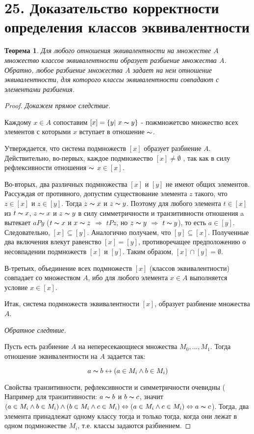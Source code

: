 \documentclass[a4paper,12pt]{article}
\newtheorem*{theorem}{Теорема}
\begin{document}
        \section*{25. Доказательство корректности определения классов эквивалентности}
        \begin{theorem}
            Для любого отношения эквивалентности на множестве $A$ множество классов эквивалентности образует разбиение множества $A$. Обратно, любое разбиение множества $A$ задает на нем отношение эквивалентности, для которого классы эквивалентности совпадают с элементами разбиения.
        \end{theorem}

        \begin{proof}
            \textit{Докажем прямое следствие.}

            Каждому $x \in A$ сопоставим $[x] = \{y|\ x\thicksim y\}$ - пожмножетсво множество всех элементов с которыми $x$ вступает в отношение $\thicksim $.

            Утверждается, что система подмножеств $[x]$ образует разбиение $A$. Действительно, во-первых, каждое подмножество $[x] \ne \emptyset$ , так как в силу рефлексивности отношения $\thicksim $  $x \in [x]$.

            Во-вторых,  два различных подмножества $[x]$ и $[y]$ не имеют общих элементов. Рассуждая от противного, допустим существование элемента $z$ такого, что $z \in [x]$ и $z \in [y]$. Тогда $z\thicksim x$ и $z\thicksim y$. Поэтому для любого элемента $t \in [x]$ из $t\thicksim x$, $z\thicksim x$ и $z\thicksim y$ в силу симметричности и транзитивности отношения a вытекает $aPy$ ($t\thicksim x$ и $x\thicksim z$ $\Rightarrow$ $tPz$, но $z\thicksim y$ $\Rightarrow$ $t\thicksim y$), то есть $a \in [y]$. Следовательно, $[x] \subseteq [y]$. Аналогично получаем, что $[y] \subseteq [x]$. Полученные два включения влекут равенство $[x] = [y]$, противоречащее предположению о несовпадении подмножеств $[x]$ и $[y]$. Таким образом, $[x] \cap [y] = \emptyset$.

            В-третьих, объединение всех подмножеств $[x]$ (классов эквивалентности) совпадает со множеством $A$, ибо для любого элемента $x \in A$ выполняется условие $x \in [x]$.

            Итак, система подмножеств эквивалентности $[x]$, образует разбиение множества $A$.

            \textit{Обратное следтвие.}

            Пусть есть разбиение $A$ на непересекающиеся множества $M_0, \ldots, M_1$. Тогда отношение эквивалентности на $A$ задается так:

            $$a \thicksim b \leftrightarrow (a \in M_i \wedge b \in M_i)$$

             Свойства транзитивности, рефлексивности и симметричности очевидны ( Например для транзитивности: $a \thicksim b$ и $b \thicksim c$, значит $(a \in M_i \wedge b \in M_i) \wedge (b \in M_i \wedge c \in M_i) \Leftrightarrow (a \in M_i \wedge c \in M_i) \Leftrightarrow a \thicksim c$). Тогда, два элемента принадлежат одному классу тогда и только тогда, когда они лежат в одном подмножестве $M_i$, т.е. классы задаются разбиением.
        \end{proof}
\end{document}
